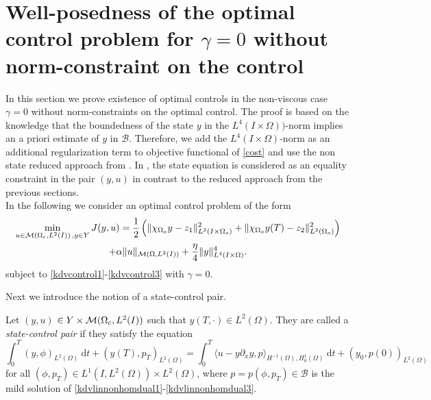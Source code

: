 \section{Well-posedness of the optimal control problem for {\color{red} $\gamma=0$ without norm-constraint on the control}}
\label{wp2}
{\color{red} In this section we prove existence of optimal controls in the non-viscous case $\gamma=0$ without norm-constraints on the optimal control.} The proof is based on the knowledge that the boundedness of the state $y$ in the $L^4(I\times\Omega))$-norm implies an a priori estimate of $y$ in $\mathcal B$. Therefore, we add the $L^4(I\times\Omega)$-norm as an additional regularization term to objective functional of \eqref{cost} and use the non state reduced approach from \cite{lions1985control}. In \cite{lions1985control}, the state equation is considered as an equality constraint in the pair $(y,u)$ in contrast to the reduced approach from the previous sections.\\
In the following we consider an optimal control problem of the form
\begin{multline}
\min_{u \in \M\,,y\in Y}J(y,u)=\frac{1}{2}\left(\norm{\chi_{\Omega_{o}}y - z_1}_{L^2(I\times \Omega_{o})}^2+\|\chi_{\Omega_{o}}y(T)-z_2\|_{L^2(\Omega_{o})}^2\right) \\+ \alpha \norm{u}_{\mathcal{M}(\Omega, L^{2}(I))} + \frac{\eta}{4} \norm{y}_{L^4(I\times \Omega)}^4.
\label{cost2}
\end{multline}
subject to \eqref{kdvcontrol1}-\eqref{kdvcontrol3} with $\gamma=0$. %

Next we introduce the notion of a state-control pair.
\begin{definition}\label{statecontrolpair}
Let $(y,u)$ $\in Y\times \mathcal{M}(\Omega_c, L^{2}(I))$ such that $y(T,\cdot)\in L^2(\Omega)$. They are called a \textit{state-control pair} if they satisfy the equation
\begin{equation}\label{weakformkdv L4}
\int_0^T(y,\phi)_{L^2(\Omega)}~\mathrm dt+(y(T),p_T)_{L^2(\Omega)}=\int_0^T\langle u-y\partial_xy,p\rangle_{H^{-1}(\Omega),H^1_0(\Omega)}~\mathrm dt+(y_0,p(0))_{L^2(\Omega)}
\end{equation}
for all $(\phi,p_T) \in L^{1}(I,L^2(\Omega))\times L^2(\Omega)$, where $p = p(\phi,p_T)\in \mathcal B$ is the mild solution of \eqref{kdvlinnonhomdual1}-\eqref{kdvlinnonhomdual3}.
\end{definition}

